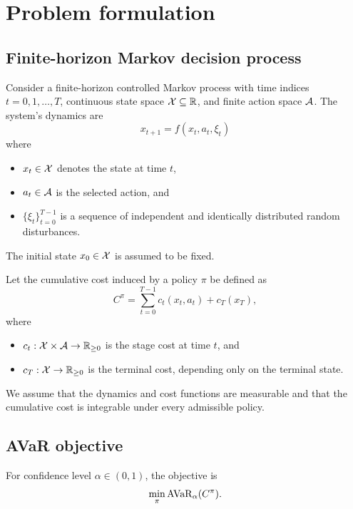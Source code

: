 \section{Problem formulation}
\label{sec:problem}

\subsection{Finite-horizon Markov decision process}
\label{problem:mdp}

Consider a finite-horizon controlled Markov process with time
indices $t=0,1,\ldots,T$, continuous state space
$\mathcal{X}\subseteq\mathbb{R}$, and finite action space
$\mathcal{A}$. The system's dynamics are
\begin{equation}
	x_{t+1} = f(x_t, a_t, \xi_t)
	\label{transition-dynamics}	
\end{equation}
where 
\begin{itemize}
	\item $x_t\in\mathcal{X}$ denotes the state at time $t$,
	\item $a_t\in\mathcal{A}$ is the selected action, and
	\item $\{\xi_t\}_{t=0}^{T-1}$ is a sequence of independent and identically distributed random disturbances.
\end{itemize}
The initial state $x_0\in\mathcal{X}$ is assumed to be fixed.

Let the cumulative cost induced by a policy $\pi$ be defined as
\begin{equation}
	C^\pi = \sum_{t=0}^{T-1}c_t(x_t,a_t)+c_T(x_T),
	\label{total-cost}
\end{equation}
where 
\begin{itemize}
	\item $c_t:\mathcal{X} \times \mathcal{A} \to\mathbb{R}_{\geq 0}$ is the stage cost at time $t$, and
	\item $c_T:\mathcal{X}\to\mathbb{R}_{\geq 0}$ is the terminal cost, depending only on the terminal state.
\end{itemize} 

We assume that the dynamics and cost functions are measurable
and that the cumulative cost is integrable under every
admissible policy.

\subsection{AVaR objective}
\label{problem:avar}

For confidence level $\alpha\in(0,1)$, the objective is
\begin{equation}
	\min_{\pi} \operatorname{AVaR}_{\alpha}(C^\pi).
	\notag
	\label{minimize-avar}
\end{equation}

